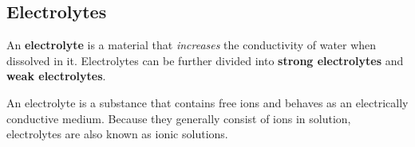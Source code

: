             \subsection*{Electrolytes}
            \nopagebreak
        \label{m38720*id338650}An \textbf{electrolyte} is a material that \textsl{increases} the conductivity of water when dissolved in it. Electrolytes can be further divided into \textbf{strong electrolytes} and \textbf{weak electrolytes}.\par 
\label{m38720*fhsst!!!underscore!!!id641}
 { \label{m38720*meaningfhsst!!!underscore!!!id641}
        An electrolyte is a substance that contains free ions and behaves as an electrically conductive medium. Because they generally consist of ions in solution, electrolytes are also known as ionic solutions. 
         } 

